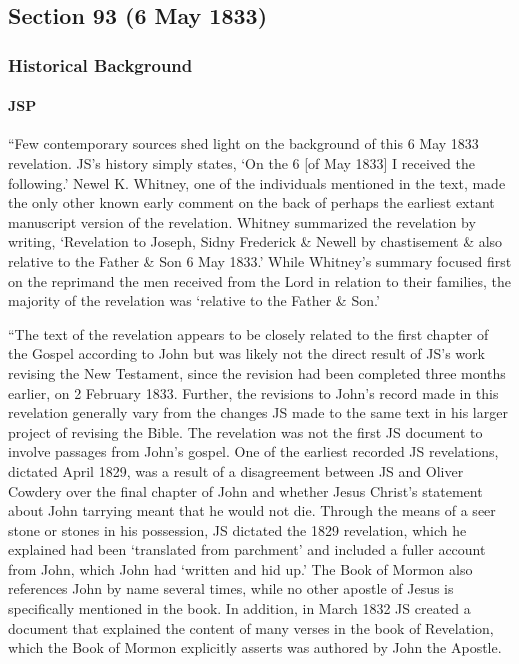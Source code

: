 \subsection{Section 93 (6 May 1833)}
	\label{DC93}
	
	\subsubsection{Historical Background}
		\label{DC93-HB}
		
		\paragraph{JSP}
		
			``Few contemporary sources shed light on the background of this 6 May 1833 revelation. JS's history simply states, `On the 6 [of May 1833] I received the following.' Newel K. Whitney, one of the individuals mentioned in the text, made the only other known early comment on the back of perhaps the earliest extant manuscript version of the revelation. Whitney summarized the revelation by writing, `Revelation to Joseph, Sidny Frederick \& Newell by chastisement \& also relative to the Father \& Son 6 May 1833.' While Whitney's summary focused first on the reprimand the men received from the Lord in relation to their families, the majority of the revelation was `relative to the Father \& Son.'

			``The text of the revelation appears to be closely related to the first chapter of the Gospel according to John but was likely not the direct result of JS's work revising the New Testament, since the revision had been completed three months earlier, on 2 February 1833. Further, the revisions to John's record made in this revelation generally vary from the changes JS made to the same text in his larger project of revising the Bible. The revelation was not the first JS document to involve passages from John's gospel. One of the earliest recorded JS revelations, dictated April 1829, was a result of a disagreement between JS and Oliver Cowdery over the final chapter of John and whether Jesus Christ's statement about John tarrying meant that he would not die. Through the means of a seer stone or stones in his possession, JS dictated the 1829 revelation, which he explained had been `translated from parchment' and included a fuller account from John, which John had `written and hid up.' The Book of Mormon also references John by name several times, while no other apostle of Jesus is specifically mentioned in the book. In addition, in March 1832 JS created a document that explained the content of many verses in the book of Revelation, which the Book of Mormon explicitly asserts was authored by John the Apostle.


